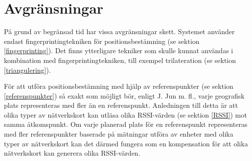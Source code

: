 \documentclass[a4paper,12pt]{article}
\begin{document}



 \section{Avgränsningar}
 På grund av begränsad tid har vissa avgränsningar skett. Systemet använder endast fingerprintingtekniken för positionsbestämning (se sektion \ref{fingerprinting}). Det finns ytterligare tekniker som skulle kunnat användas i kombination med fingerprintingtekniken, till exempel trilateration (se sektion \ref{triangulering}).

 För att utföra positionsbestämning med hjälp av referenspunkter (se sektion \ref{referenspunkter}) så exakt som möjligt bör, enligt J. Jun m. fl., varje geografisk plats representeras med fler än en referenspunkt\cite{jun2018low}.
 Anledningen till detta är att olika typer av nätverkskort kan utläsa olika RSSI-värden (se sektion \ref{RSSI}) mot samma åtkomspunkt\cite{problem_with_RSSI}. Om varje planerad plats för en referenspunkt representeras med fler referenspunkter baserade på mätningar utföra av enheter med olika typer av nätverkskort kan det därmed fungera som en kompensation för att olika nätverkskort kan generera olika RSSI-värden\cite{jun2018low}.
\end{document}
